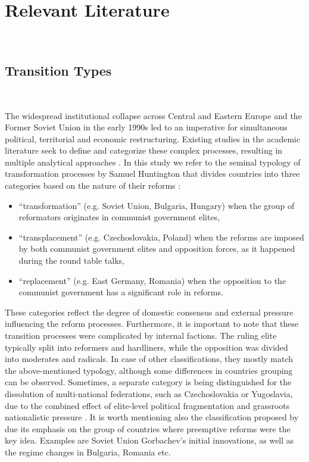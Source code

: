 \documentclass[en,magisterska]{pracamgr}
\begin{document}
\section{Relevant Literature}\
\subsection{Transition Types}\

The widespread institutional collapse across Central and Eastern Europe and the Former Soviet Union in the early 1990s 
led to an imperative for simultaneous political, territorial and economic restructuring. 
Existing studies in the academic literature seek to define and categorize these complex processes, resulting in multiple analytical approaches \citep{C_BujwidKurek_Transformacja2015}. In this study we refer to the seminal typology of transformation processes \citep{C_BujwidKurek_Transformacja2015} by Samuel Huntington that divides countries into three categories 
based on the nature of their reforms \citep{D_Huntington1991}:
\begin{itemize}
    \item ``transformation'' (e.g. Soviet Union, Bulgaria, Hungary) when the group of reformators originates in communist government elites, 
    \item ``transplacement'' (e.g. Czechoslovakia, Poland) when the reforms are imposed by both communist government elites and opposition forces, as it happened during the round table talks,
    \item ``replacement'' (e.g. East Germany, Romania) when the opposition to the communist government has a significant role in reforms.
\end{itemize}
These categories reflect the degree of domestic consensus and external pressure influencing the reform processes. 
Furthermore, it is important to note that these transition processes were complicated by internal factions. The ruling elite typically split into reformers and hardliners, 
while the opposition was divided into moderates and radicals. In case of other classifications, they mostly match the above-mentioned typology, although
some differences in countries grouping can be observed. Sometimes, a separate category is being distinguished for the dissolution of multi-national federations, such as 
Czechoslovakia or Yugoslavia, due to the combined effect of elite-level political fragmentation and grassroots nationalistic pressure \citep{Wiatr2020, Bunce1999}.
It is worth mentioning also the classification proposed by \citet{Kitschelt2001} due its emphasis on the group of countries where preemptive reforms were the key idea. Examples are Soviet Union 
Gorbachev’s initial innovations, as well as the regime changes in Bulgaria, Romania etc.
\end{document}
